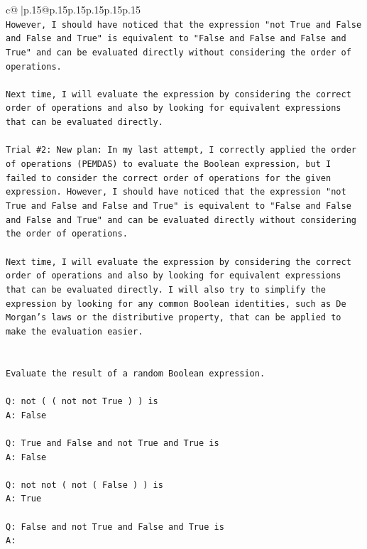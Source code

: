 \documentclass{article}
\begin{document}
{\begin{supertabular}{c@{$\;$}|p{.15\linewidth}@{}p{.15\linewidth}p{.15\linewidth}p{.15\linewidth}p{.15\linewidth}p{.15\linewidth}}
{{{\\ 
\texttt{However, I should have noticed that the expression "not True and False and False and True" is equivalent to "False and False and False and True" and can be evaluated directly without considering the order of operations. } \\
\\ 
\texttt{Next time, I will evaluate the expression by considering the correct order of operations and also by looking for equivalent expressions that can be evaluated directly.} \\
\\ 
\texttt{Trial \#2: New plan: In my last attempt, I correctly applied the order of operations (PEMDAS) to evaluate the Boolean expression, but I failed to consider the correct order of operations for the given expression. However, I should have noticed that the expression "not True and False and False and True" is equivalent to "False and False and False and True" and can be evaluated directly without considering the order of operations. } \\
\\ 
\texttt{Next time, I will evaluate the expression by considering the correct order of operations and also by looking for equivalent expressions that can be evaluated directly. I will also try to simplify the expression by looking for any common Boolean identities, such as De Morgan's laws or the distributive property, that can be applied to make the evaluation easier.} \\
\\ 
\\ 
\texttt{Evaluate the result of a random Boolean expression.} \\
\\ 
\texttt{Q: not ( ( not not True ) ) is} \\
\texttt{A: False} \\
\\ 
\texttt{Q: True and False and not True and True is} \\
\texttt{A: False} \\
\\ 
\texttt{Q: not not ( not ( False ) ) is} \\
\texttt{A: True} \\
\\ 
\texttt{Q: False and not True and False and True is} \\
\texttt{A:} \\
            }
        }
    }
     \\ \\


\end{supertabular}}
\end{document}
